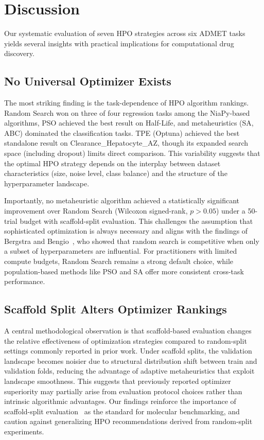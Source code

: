 \documentclass[12pt]{article}
\begin{document}
\section{Discussion}
\label{sec:discussion}

Our systematic evaluation of seven HPO strategies across six ADMET tasks yields several insights with practical implications for computational drug discovery.

\subsection{No Universal Optimizer Exists}

The most striking finding is the task-dependence of HPO algorithm rankings. Random Search won on three of four regression tasks among the NiaPy-based algorithms, PSO achieved the best result on Half-Life, and metaheuristics (SA, ABC) dominated the classification tasks. TPE (Optuna) achieved the best standalone result on Clearance\_Hepatocyte\_AZ, though its expanded search space (including dropout) limits direct comparison. This variability suggests that the optimal HPO strategy depends on the interplay between dataset characteristics (size, noise level, class balance) and the structure of the hyperparameter landscape.

Importantly, no metaheuristic algorithm achieved a statistically significant improvement over Random Search (Wilcoxon signed-rank, $p > 0.05$) under a 50-trial budget with scaffold-split evaluation. This challenges the assumption that sophisticated optimization is always necessary and aligns with the findings of Bergstra and Bengio~\cite{bergstra2012random}, who showed that random search is competitive when only a subset of hyperparameters are influential. For practitioners with limited compute budgets, Random Search remains a strong default choice, while population-based methods like PSO and SA offer more consistent cross-task performance.

\subsection{Scaffold Split Alters Optimizer Rankings}

A central methodological observation is that scaffold-based evaluation changes the relative effectiveness of optimization strategies compared to random-split settings commonly reported in prior work. Under scaffold splits, the validation landscape becomes noisier due to structural distribution shift between train and validation folds, reducing the advantage of adaptive metaheuristics that exploit landscape smoothness. This suggests that previously reported optimizer superiority may partially arise from evaluation protocol choices rather than intrinsic algorithmic advantages. Our findings reinforce the importance of scaffold-split evaluation~\cite{wu2018moleculenet, yang2019analyzing} as the standard for molecular benchmarking, and caution against generalizing HPO recommendations derived from random-split experiments.
\end{document}
